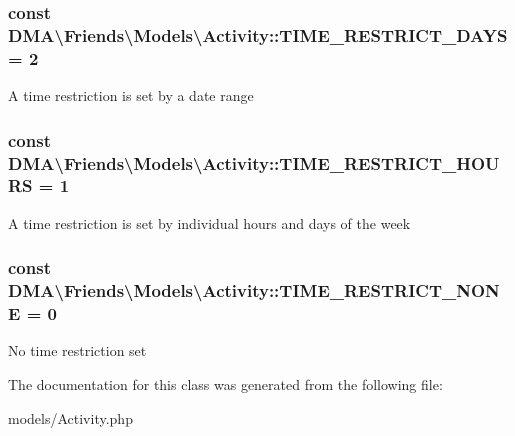 \subsubsection[{T\+I\+M\+E\+\_\+\+R\+E\+S\+T\+R\+I\+C\+T\+\_\+\+D\+A\+Y\+S}]{\setlength{\rightskip}{0pt plus 5cm}const D\+M\+A\textbackslash{}\+Friends\textbackslash{}\+Models\textbackslash{}\+Activity\+::\+T\+I\+M\+E\+\_\+\+R\+E\+S\+T\+R\+I\+C\+T\+\_\+\+D\+A\+Y\+S = 2}\label{classDMA_1_1Friends_1_1Models_1_1Activity_a71b85478f20cda144aeffe010364a0f7}
A time restriction is set by a date range \hypertarget{classDMA_1_1Friends_1_1Models_1_1Activity_ac78040e8784e02c2d1bcce5221ac6cb8}{}
\subsubsection[{T\+I\+M\+E\+\_\+\+R\+E\+S\+T\+R\+I\+C\+T\+\_\+\+H\+O\+U\+R\+S}]{\setlength{\rightskip}{0pt plus 5cm}const D\+M\+A\textbackslash{}\+Friends\textbackslash{}\+Models\textbackslash{}\+Activity\+::\+T\+I\+M\+E\+\_\+\+R\+E\+S\+T\+R\+I\+C\+T\+\_\+\+H\+O\+U\+R\+S = 1}\label{classDMA_1_1Friends_1_1Models_1_1Activity_ac78040e8784e02c2d1bcce5221ac6cb8}
A time restriction is set by individual hours and days of the week \hypertarget{classDMA_1_1Friends_1_1Models_1_1Activity_ab9dd8b18c4810beabdcf8e45039913c8}{}
\subsubsection[{T\+I\+M\+E\+\_\+\+R\+E\+S\+T\+R\+I\+C\+T\+\_\+\+N\+O\+N\+E}]{\setlength{\rightskip}{0pt plus 5cm}const D\+M\+A\textbackslash{}\+Friends\textbackslash{}\+Models\textbackslash{}\+Activity\+::\+T\+I\+M\+E\+\_\+\+R\+E\+S\+T\+R\+I\+C\+T\+\_\+\+N\+O\+N\+E = 0}\label{classDMA_1_1Friends_1_1Models_1_1Activity_ab9dd8b18c4810beabdcf8e45039913c8}
No time restriction set 

The documentation for this class was generated from the following file\+:\begin{DoxyCompactItemize}
\item 
models/Activity.\+php\end{DoxyCompactItemize}
